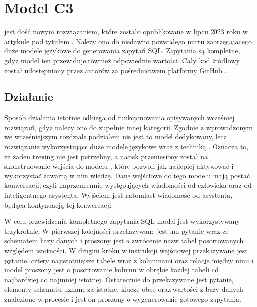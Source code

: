 \section{Model C3}
 jest dość nowym rozwiązaniem, które zostało opublikowane w lipcu 2023 roku w artykule pod tytułem  . Należy ono do niedawno powstałego nurtu zaprzęgającego duże modele językowe do generowania zapytań SQL. Zapytania są kompletne, gdyż model ten przewiduje również odpowiednie wartości. Cały kod źródłowy  został udostępniony przez autorów za pośrednictwem platformy GitHub . 

\subsection{Działanie}
Sposób działania  istotnie odbiega od funkcjonowania opisywanych wcześniej rozwiązań, gdyż należy ono do zupełnie innej kategorii. Zgodnie z wprowadzonym we wcześniejszym rozdziale podziałem nie jest to model dedykowany, lecz rozwiązanie wykorzystujące duże modele językowe wraz z techniką . Oznacza to, że żaden trening nie jest potrzebny, a nacisk przeniesiony został na skonstruowanie wejścia do modelu , które pozwoli jak najlepiej aktywować i wykorzystać zawartą w nim wiedzę. Dane wejściowe do tego modelu mają postać konwersacji, czyli naprzemiennie występujących wiadomości od człowieka oraz od inteligentnego asystenta. Wyjściem jest natomiast wiadomość od asystenta, będąca kontynuacją tej konwersacji.

W celu przewidzenia kompletnego zapytania SQL model  jest wykorzystywany trzykrotnie. W pierwszej kolejności przekazywane jest mu pytanie wraz ze schematem bazy danych i proszony jest o zwrócenie nazw tabel posortowanych względem istotności. W drugim kroku w instrukcji wejściowej przekazywane jest pytanie, cztery najistotniejsze tabele wraz z kolumnami oraz relacje między nimi i model proszony jest o posortowanie kolumn w obrębie każdej tabeli od najbardziej do najmniej istotnej. Ostatecznie do  przekazywane jest pytanie, elementy schematu uznane za istotne, klucze obce oraz wartości z bazy danych znalezione w procesie  i jest on proszony o wygenerowanie gotowego zapytania.

